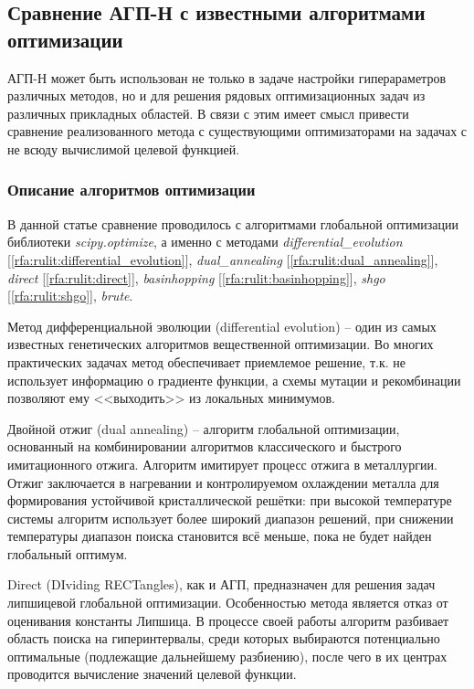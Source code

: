 \documentclass[a4paper,12pt,russian]{article}
\begin{document}
\subsection{Сравнение АГП-Н с известными алгоритмами оптимизации}

АГП-Н может быть использован не только в задаче настройки гиперараметров различных методов, но и для решения рядовых оптимизационных задач из различных прикладных областей. В связи с этим имеет смысл привести сравнение реализованного метода с существующими оптимизаторами на задачах с не всюду вычислимой целевой функцией.

\subsubsection{Описание алгоритмов оптимизации}

В данной статье сравнение проводилось с алгоритмами глобальной оптимизации библиотеки \textit{scipy.optimize}, а именно с методами \textit{differential\_evolution} [\ref{rfa:rulit:differential_evolution}], \textit{dual\_annealing} [\ref{rfa:rulit:dual_annealing}], \textit{direct} [\ref{rfa:rulit:direct}], \textit{basinhopping} [\ref{rfa:rulit:basinhopping}], \textit{shgo} [\ref{rfa:rulit:shgo}], \textit{brute}.

Метод дифференциальной эволюции (differential evolution) -- один из самых известных генетических алгоритмов вещественной оптимизации. Во многих практических задачах метод обеспечивает приемлемое решение, т.к. не использует информацию о градиенте функции, а схемы мутации и рекомбинации позволяют ему <<выходить>> из локальных минимумов.

Двойной отжиг (dual annealing) -- алгоритм глобальной оптимизации, основанный на комбинировании алгоритмов классического и быстрого имитационного отжига. Алгоритм имитирует процесс отжига в металлургии. Отжиг заключается в нагревании и контролируемом охлаждении металла для формирования устойчивой кристаллической решётки: при высокой температуре системы алгоритм использует более широкий диапазон решений, при снижении температуры диапазон поиска становится всё меньше, пока не будет найден глобальный оптимум.

Direct (DIviding RECTangles), как и АГП, предназначен для решения задач липшицевой глобальной оптимизации. Особенностью метода является отказ от оценивания константы Липшица. В процессе своей работы алгоритм разбивает область поиска на гиперинтервалы, среди которых выбираются потенциально оптимальные (подлежащие дальнейшему разбиению), после чего в их центрах проводится вычисление значений целевой функции.
\end{document}
